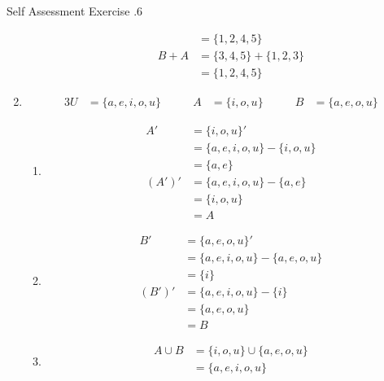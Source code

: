 \documentclass[../notes.tex]{subfiles}
\begin{document}
\begin{exercise}{Self Assessment Exercise \thechapter.6}
\begin{enumerate}
\begin{enumerate}[label=(\alph*)]
\begin{align*}
                  &= \{1, 2, 4 , 5\}\\
                  B + A &= \{3, 4, 5\} + \{1, 2, 3\}\\
                  &= \{1, 2, 4, 5\}
                \end{align*}
            \end{enumerate}
          \item \rule{0pt}{11pt} \vspace*{-25pt}
            \begin{alignat*}{3}
              U &= \{a, e, i, o, u\} \qquad & A &= \{i, o, u\} \qquad & B &= \{a, e, o, u\}
            \end{alignat*}
            \begin{enumerate}[label=(\alph*)]
              \item \rule{0pt}{11pt} \vspace*{-25pt}
                \begin{align*}
                  A' &= \{i, o, u\}'\\
                  &= \{a, e, i, o, u\} - \{i, o, u\}\\
                  &= \{a, e\}\\
                  \left(A'\right)' &= \{a, e, i, o, u\} - \{a, e\}\\
                  &= \{i, o, u\}\\
                  &= A
                \end{align*}
              \item \rule{0pt}{11pt} \vspace*{-25pt}
                \begin{align*}
                  B' &= \{a, e, o, u\}'\\
                  &= \{a, e, i, o, u\} - \{a, e, o, u\}\\
                  &= \{i\}\\
                  \left(B'\right)' &= \{a, e, i, o, u\} - \{i\}\\
                  &= \{a, e, o, u\}\\
                  &= B
                \end{align*}
              \item \rule{0pt}{11pt} \vspace*{-25pt}
                \begin{align*}
                  A \cup B &= \{i, o, u\} \cup \{a, e, o, u\}\\
                  &= \{a, e, i, o, u\}\\

\end{align*}
\end{enumerate}
\end{enumerate}
\end{exercise}
\end{document}
